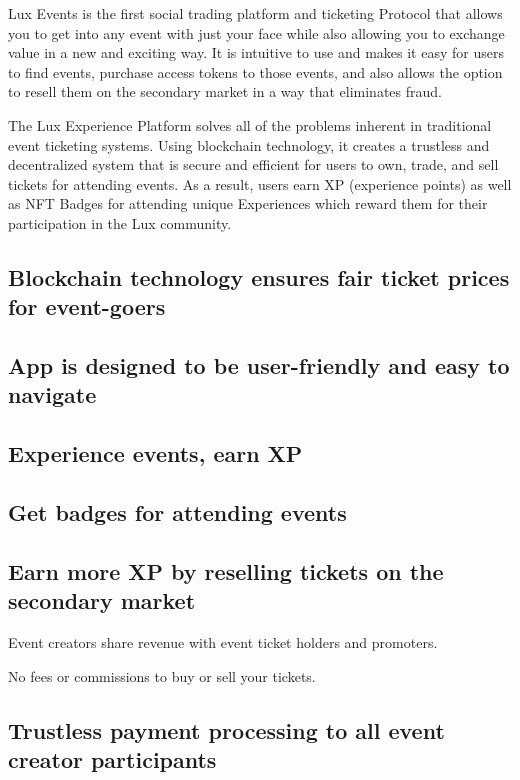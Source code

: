 \documentclass[11pt]{article}
\begin{document}
Lux Events is the first social trading platform and ticketing Protocol that allows you to get into any event with just your face while also allowing you to exchange value in a new and exciting way. It is intuitive to use and makes it easy for users to find events, purchase access tokens to those events, and also allows the option to resell them on the secondary market in a way that eliminates fraud.


The Lux Experience Platform solves all of the problems inherent in traditional event ticketing systems. Using blockchain technology, it creates a trustless and decentralized system that is secure and efficient for users to own, trade, and sell tickets for attending events. As a result, users earn XP (experience points) as well as NFT Badges for attending unique Experiences which reward them for their participation in the Lux community.


\subsection{Blockchain technology ensures fair ticket prices for event-goers}

\subsection{App is designed to be user-friendly and easy to navigate}

\subsection{Experience events, earn XP}

\subsection{Get badges for attending events}

\subsection{Earn more XP by reselling tickets on the secondary market}

Event creators share revenue with event ticket holders and promoters.


No fees or commissions to buy or sell your tickets.


\subsection{Trustless payment processing to all event creator participants}
\end{document}
